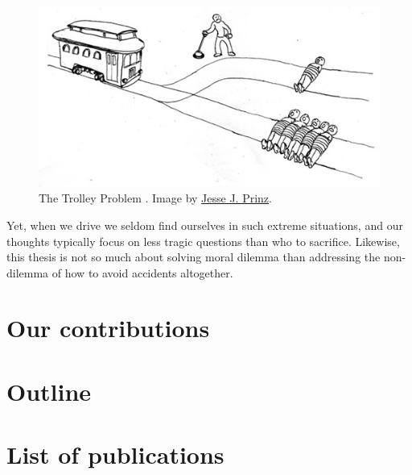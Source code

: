 \begin{figure}[tp]
	\centering
	\includegraphics[width=0.7\linewidth]{img/trolley}
	\caption{The Trolley Problem \citep{Foot1967}. Image by \href{http://subcortex.com/}{Jesse J. Prinz}.}
	\label{fig:trolley}
\end{figure}

Yet, when we drive we seldom find ourselves in such extreme situations, and our thoughts typically focus on less tragic questions than who to sacrifice.
Likewise, this thesis is not so much about solving moral dilemma than addressing the non-dilemma of how to avoid accidents altogether.%


%





\section{Our contributions}
\section{Outline}


\section{List of publications}